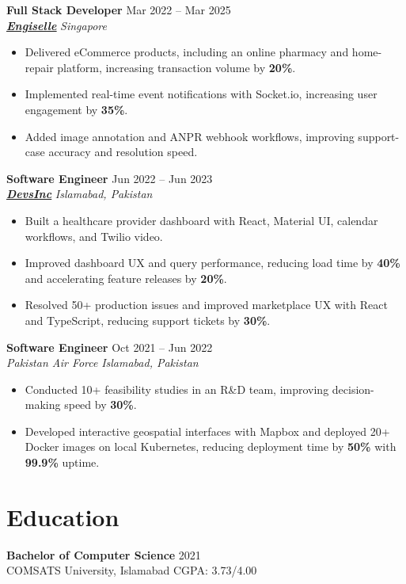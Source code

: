 \documentclass[10pt,letterpaper]{article}
\newcommand{\role}[4]{\textbf{#1} \hfill #2 \\
\textit{#3} \hfill \textit{#4}\\[-4pt]}
\begin{document}
\role{Full Stack Developer}{Mar 2022 -- Mar 2025}{\href{https://www.engiselle.com/}{\textbf{\underline{Engiselle}}}}{Singapore}
\begin{itemize}[leftmargin=*, itemsep=1pt, topsep=0pt, partopsep=0pt, parsep=0pt, after=\vspace{4pt}]
  \item Delivered eCommerce products, including an online pharmacy and home-repair platform, increasing transaction volume by \textbf{20\%}.
  \item Implemented real-time event notifications with Socket.io, increasing user engagement by \textbf{35\%}.
  \item Added image annotation and ANPR webhook workflows, improving support-case accuracy and resolution speed.
\end{itemize}

\role{Software Engineer}{Jun 2022 -- Jun 2023}{\href{https://www.devsinc.com/}{\textbf{\underline{DevsInc}}}}{Islamabad, Pakistan}
\begin{itemize}[leftmargin=*, itemsep=1pt, topsep=0pt, partopsep=0pt, parsep=0pt, after=\vspace{4pt}]
  \item Built a healthcare provider dashboard with React, Material UI, calendar workflows, and Twilio video.
  \item Improved dashboard UX and query performance, reducing load time by \textbf{40\%} and accelerating feature releases by \textbf{20\%}.
  \item Resolved 50+ production issues and improved marketplace UX with React and TypeScript, reducing support tickets by \textbf{30\%}.
\end{itemize}

\role{Software Engineer}{Oct 2021 -- Jun 2022}{Pakistan Air Force}{Islamabad, Pakistan}
\begin{itemize}[leftmargin=*, itemsep=1pt, topsep=0pt, partopsep=0pt, parsep=0pt, after=\vspace{4pt}]
  \item Conducted 10+ feasibility studies in an R\&D team, improving decision-making speed by \textbf{30\%}.
  \item Developed interactive geospatial interfaces with Mapbox and deployed 20+ Docker images on local Kubernetes, reducing deployment time by \textbf{50\%} with \textbf{99.9\%} uptime.
\end{itemize}

\section*{Education}
\textbf{Bachelor of Computer Science} \hfill 2021 \\
COMSATS University, Islamabad \hfill CGPA: 3.73/4.00
\end{document}

